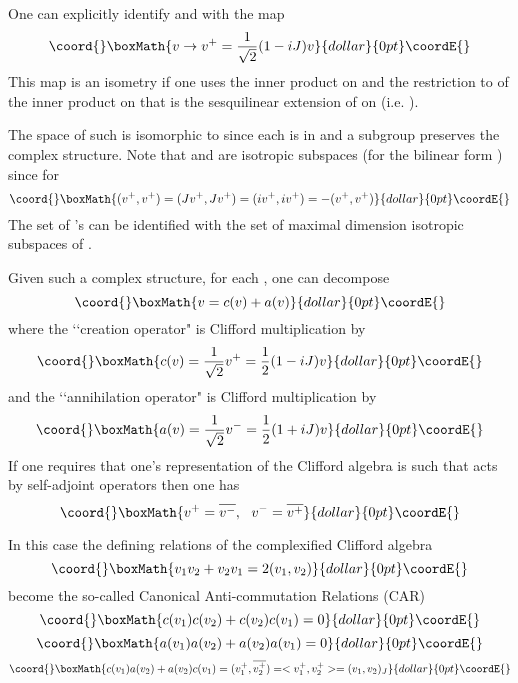 \documentclass[a4paper,a4paper]{article}
\theoremstyle{conjecture}
\begin{document}
One can explicitly identify \coordHE{} and \coordHE{} with the map
$$\coord{}\boxMath{v \rightarrow v^+=\frac{1}{\sqrt{2}}(1-iJ)v}{dollar}{0pt}\coordE{}$$
This map is an isometry if one uses the inner product \coordHE{} on \coordHE{} and the
restriction to \coordHE{} of the inner
product \myHighlight{$<\cdot,\cdot>$}\coordHE{} on \coordHE{} that is the sesquilinear extension of \myHighlight{$(\cdot,\cdot)$}\coordHE{} on \coordHE{}
(i.e. \coordHE{}).

The space \coordHE{} of such \coordHE{} is isomorphic to
\coordHE{} since each \coordHE{} is in \coordHE{} and a \coordHE{} subgroup
preserves the complex structure. Note that \coordHE{} and \coordHE{}
are isotropic subspaces (for the bilinear form \myHighlight{$(\cdot,\cdot)$}\coordHE{})
since for \coordHE{}  $$\coord{}\boxMath{(v^+,v^+)=(Jv^+,Jv^+)=(iv^+,iv^+)=-(v^+,v^+)}{dollar}{0pt}\coordE{}$$
The set of \coordHE{}'s can be identified with the set of maximal dimension isotropic subspaces of \coordHE{}.

Given such a complex structure, for each \coordHE{}, one
can decompose
$$\coord{}\boxMath{v=c(v)+a(v)}{dollar}{0pt}\coordE{}$$
where
the \lq\lq creation operator" \coordHE{} is Clifford multiplication by $$\coord{}\boxMath{c(v)=\frac{1}{\sqrt{2}}v^+=\frac{1}{2}(1-iJ)v}{dollar}{0pt}\coordE{}$$
and the \lq\lq annihilation operator" \coordHE{} is Clifford multiplication by
$$\coord{}\boxMath{a(v)=\frac{1}{\sqrt{2}}v^-=\frac{1}{2}(1+iJ)v}{dollar}{0pt}\coordE{}$$
If one requires that one's representation of the Clifford algebra
is such that \coordHE{} acts by self-adjoint operators then one has
$$\coord{}\boxMath{v^+=\overline {v^-},\ \  v^-=\overline{v^+}}{dollar}{0pt}\coordE{}$$

In this case the defining relations of the complexified Clifford
algebra
$$\coord{}\boxMath{v_1v_2+v_2v_1=2(v_1,v_2)}{dollar}{0pt}\coordE{}$$
become the so-called
Canonical Anti-commutation Relations (CAR)
$$\coord{}\boxMath{c(v_1)c(v_2)+c(v_2)c(v_1)=0}{dollar}{0pt}\coordE{}$$  $$\coord{}\boxMath{a(v_1)a(v_2)+a(v_2)a(v_1)=0}{dollar}{0pt}\coordE{}$$  $$\coord{}\boxMath{c(v_1)a(v_2)+a(v_2)c(v_1)=(v^+_1,\overline{v^+_2})=<v^+_1,v^+_2>=(v_1,v_2)_J}{dollar}{0pt}\coordE{}$$
\end{document}
